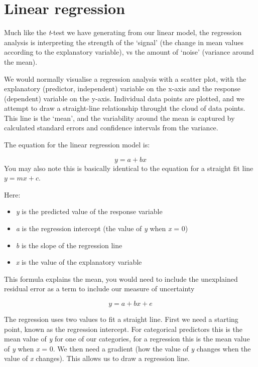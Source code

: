 \documentclass[
]{book}
\begin{document}
\hypertarget{linear-regression}{%
\section{Linear regression}\label{linear-regression}}

Much like the \emph{t}-test we have generating from our linear model, the regression analysis is interpreting the strength of the `signal' (the change in mean values according to the explanatory variable), vs the amount of `noise' (variance around the mean).

We would normally visualise a regression analysis with a scatter plot, with the explanatory (predictor, independent) variable on the x-axis and the response (dependent) variable on the y-axis. Individual data points are plotted, and we attempt to draw a straight-line relationship throught the cloud of data points. This line is the `mean', and the variability around the mean is captured by calculated standard errors and confidence intervals from the variance.

The equation for the linear regression model is:

\[ y = a + bx \]
You may also note this is basically identical to the equation for a straight fit line \(y = mx +c\).

Here:

\begin{itemize}
\item
  \emph{y} is the predicted value of the response variable
\item
  \emph{a} is the regression intercept (the value of \emph{y} when \emph{x} = 0)
\item
  \emph{b} is the slope of the regression line
\item
  \emph{x} is the value of the explanatory variable
\end{itemize}

This formula explains the mean, you would need to include the unexplained residual error as a term to include our measure of uncertainty

\[ y = a + bx + e \]

The regression uses two values to fit a straight line. First we need a starting point, known as the regression intercept. For categorical predictors this is the mean value of \emph{y} for one of our categories, for a regression this is the mean value of \emph{y} when \emph{x} = 0. We then need a gradient (how the value of \emph{y} changes when the value of \emph{x} changes). This allows us to draw a regression line.
\end{document}

